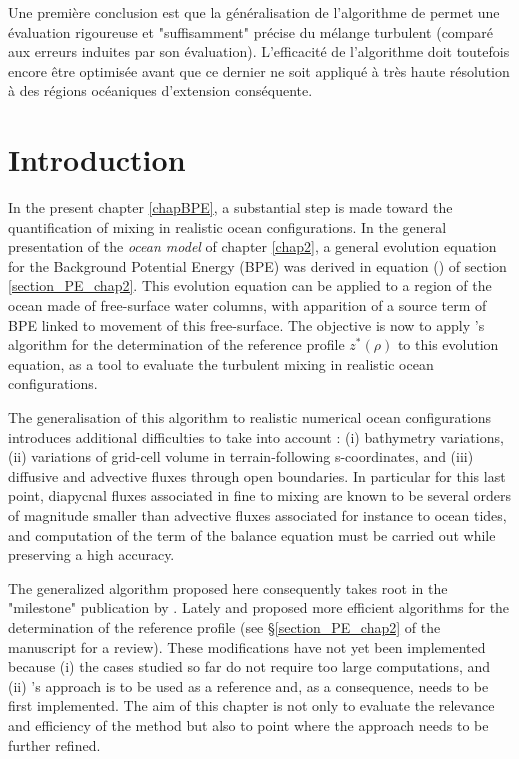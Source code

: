 Une première conclusion est que la généralisation de l'algorithme de \cite{winters_available_1995} permet une évaluation rigoureuse et "suffisamment" précise du mélange turbulent (comparé aux erreurs induites par son évaluation). L'efficacité de l'algorithme doit toutefois encore être optimisée avant que ce dernier ne soit appliqué à très haute résolution à des régions océaniques d'extension conséquente.

\section{Introduction}
In the present chapter \ref{chapBPE}, a substantial step is made toward the quantification of mixing in realistic ocean configurations. In the general presentation of the \textit{ocean model} of chapter \ref{chap2}, a general evolution equation for the Background Potential Energy (BPE) was derived in equation () of section \ref{section_PE_chap2}. This evolution equation can be applied to a region of the ocean made of free-surface water columns, with apparition of a source term of BPE linked to movement of this free-surface. The objective is now to apply \citet{winters_available_1995}'s algorithm for the determination of the reference profile $z^*(\rho)$ to this evolution equation, as a tool to evaluate the turbulent mixing in realistic ocean configurations.

The generalisation of this algorithm to realistic numerical ocean configurations introduces additional difficulties to take into account : (i) bathymetry variations, (ii) variations of grid-cell volume in terrain-following s-coordinates, and (iii) diffusive and advective fluxes through open boundaries. In particular for this last point, diapycnal fluxes associated in fine to mixing are known to be several orders of magnitude smaller than advective fluxes associated for instance to ocean tides, and computation of the term of the balance equation must be carried out while preserving a high accuracy.


The generalized algorithm proposed here consequently takes root in the "milestone" publication by \citet{winters_available_1995}. Lately \citet{saenz_estimating_2015} and \citet{tailleux_local_2018} proposed more efficient algorithms for the determination of the reference profile (see \S \ref{section_PE_chap2} of the manuscript for a review). These modifications have not yet been implemented because (i) the cases studied so far do not require too large computations, and (ii) \citet{winters_available_1995}'s approach is to be used as a reference and, as a consequence, needs to be first implemented. The aim of this chapter is not only to evaluate the relevance and efficiency of the method but also to point where the approach needs to be further refined.


